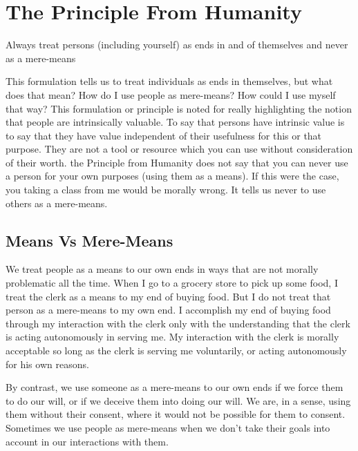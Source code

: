 \section{The Principle From Humanity}
\begin{center}
Always treat persons (including yourself) as ends in and of themselves and never as a mere-means
\end{center}
This formulation tells us to treat individuals as ends in themselves, but what does that mean? How do I use people as mere-means? How could I use myself that way? This formulation or principle is noted for really highlighting the notion that people are intrinsically valuable. To say that persons have intrinsic value is to say that they have value independent of their usefulness for this or that purpose.  They are not a tool or resource which you can use without consideration of their worth. the Principle from Humanity does not say that you can never use a person for your own purposes (using them as a means). If this were the case, you taking a class from me would be morally wrong. It tells us never to use others as a mere-means.
\subsection{Means Vs Mere-Means}

We treat people as a means to our own ends in ways that are not morally problematic all the time. When I go to a grocery store to pick up some food, I treat the clerk as a means to my end of buying food. But I do not treat that person as a mere-means to my own end. I accomplish my end of buying food through my interaction with the clerk only with the understanding that the clerk is acting autonomously in serving me. My interaction with the clerk is morally acceptable so long as the clerk is serving me voluntarily, or acting autonomously for his own reasons.

By contrast, we use someone as a mere-means to our own ends if we force them to do our will, or if we deceive them into doing our will. We are, in a sense, using them without their consent, where it would not be possible for them to consent. Sometimes we use people as mere-means when we don't take their goals into account in our interactions with them.


